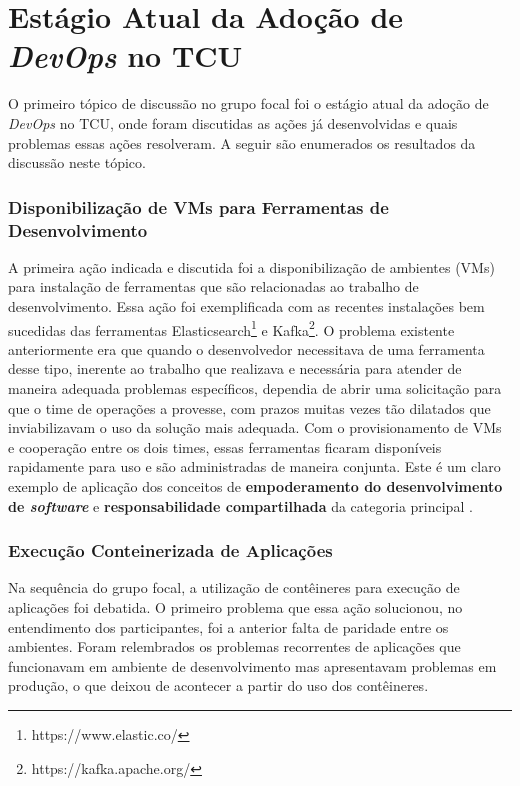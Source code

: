 \section{Estágio Atual da Adoção de \emph{DevOps} no \acrshort{TCU}}\label{secao_resultados_grupo_1}

O primeiro tópico de discussão no grupo focal foi o estágio atual da adoção de
{\it DevOps} no \acrshort{TCU}, onde foram discutidas as ações já desenvolvidas
e quais problemas essas ações resolveram. A seguir são enumerados os
resultados da discussão neste tópico.

\subsubsection{Disponibilização de \acrshort{VM}s para Ferramentas de Desenvolvimento}

A primeira ação indicada e discutida foi a disponibilização de ambientes (\acrshort{VM}s)
para instalação de ferramentas que são relacionadas ao trabalho de
desenvolvimento. Essa ação foi exemplificada com as recentes instalações bem
sucedidas das ferramentas Elasticsearch\footnote{https://www.elastic.co/} e Kafka\footnote{https://kafka.apache.org/}.
O problema existente anteriormente era que quando o desenvolvedor necessitava de
uma ferramenta desse tipo, inerente ao trabalho que realizava e necessária para
atender de maneira adequada problemas específicos, dependia de abrir uma
solicitação para que o time de operações a provesse, com prazos muitas vezes
tão dilatados que inviabilizavam o uso da solução mais adequada. Com o
provisionamento de \acrshort{VM}s e cooperação entre os dois times, essas
ferramentas ficaram disponíveis rapidamente para uso e são administradas de
maneira conjunta. Este é um claro exemplo de aplicação dos conceitos de
{\bf empoderamento do desenvolvimento de \emph{software}} e {\bf responsabilidade
compartilhada} da categoria principal .

\subsubsection{Execução Conteinerizada de Aplicações}

Na sequência do grupo focal, a utilização de contêineres para execução de
aplicações foi debatida. O primeiro problema que essa ação solucionou, no
entendimento dos participantes, foi a anterior falta de paridade entre os
ambientes. Foram relembrados os problemas recorrentes de aplicações que
funcionavam em ambiente de desenvolvimento mas apresentavam problemas em
produção, o que deixou de acontecer a partir do uso dos contêineres.

